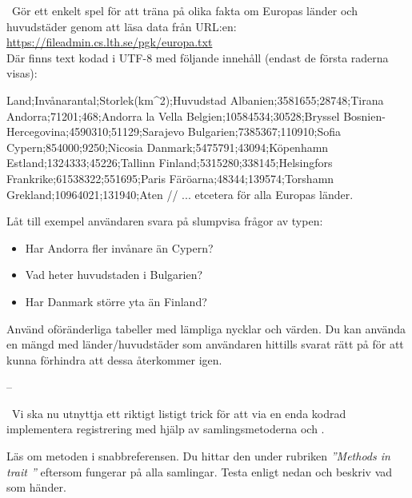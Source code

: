 \ExtraTasks %


\QUESTBEGIN

\Task \what~Gör ett enkelt spel för att träna på olika fakta om Europas länder och huvudstäder genom att läsa data från URL:en:\\ \url{https://fileadmin.cs.lth.se/pgk/europa.txt}
\\Där finns text kodad i UTF-8 med följande innehåll (endast de första raderna visas):
\begin{Code}
Land;Invånarantal;Storlek(km^2);Huvudstad
Albanien;3581655;28748;Tirana
Andorra;71201;468;Andorra la Vella
Belgien;10584534;30528;Bryssel
Bosnien-Hercegovina;4590310;51129;Sarajevo
Bulgarien;7385367;110910;Sofia
Cypern;854000;9250;Nicosia
Danmark;5475791;43094;Köpenhamn
Estland;1324333;45226;Tallinn
Finland;5315280;338145;Helsingfors
Frankrike;61538322;551695;Paris
Färöarna;48344;139574;Torshamn
Grekland;10964021;131940;Aten
// ... etcetera för alla Europas länder.
\end{Code}
Låt till exempel användaren svara på slumpvisa frågor av typen:
\begin{itemize}[noitemsep]
  \item Har Andorra fler invånare än Cypern?
  \item Vad heter huvudstaden i Bulgarien?
  \item Har Danmark större yta än Finland?
\end{itemize}
Använd oföränderliga tabeller med lämpliga nycklar och värden. Du kan använda en mängd med länder/huvudstäder som användaren hittills svarat rätt på för att kunna förhindra att dessa återkommer igen.
\SOLUTION

\TaskSolved --

\QUESTEND



\AdvancedTasks %



\QUESTBEGIN

\Task \what~Vi ska nu utnyttja ett riktigt listigt trick för att via en enda kodrad implementera registrering med hjälp av samlingsmetoderna  och .

\Subtask Läs om metoden  i snabbreferensen. Du hittar den under rubriken \emph{''Methods in trait ''} eftersom  fungerar på alla samlingar. Testa  enligt nedan och beskriv vad som händer.

